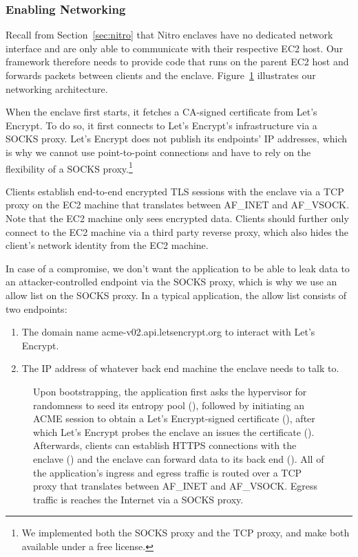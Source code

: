 
\subsubsection{Enabling Networking}
\label{sec:networking}

Recall from Section~\ref{sec:nitro} that Nitro enclaves have no dedicated network interface and are only able to communicate with their respective EC2 host.  Our framework therefore needs to provide code that runs on the parent EC2 host and forwards packets between clients and the enclave.  Figure~\ref{fig:networking} illustrates our networking architecture.

When the enclave first starts, it fetches a CA-signed certificate from Let's Encrypt.  To do so, it first connects to Let's Encrypt's infrastructure via a SOCKS proxy.  Let's Encrypt does not publish its endpoints' IP addresses, which is why we cannot use point-to-point connections and have to rely on the flexibility of a SOCKS proxy.\footnote{We implemented both the SOCKS proxy and the TCP proxy, and make both available under a free license.}

Clients establish end-to-end encrypted TLS sessions with the enclave via a TCP proxy on the EC2 machine that translates between AF\_INET and AF\_VSOCK.  Note that the EC2 machine only sees encrypted data. Clients should further only connect to the EC2 machine via a third party reverse proxy, which also hides the client's network identity from the EC2 machine.

In case of a compromise, we don't want the application to be able to leak data to an attacker-controlled endpoint via the SOCKS proxy, which is why we use an allow list on the SOCKS proxy.  In a typical application, the allow list consists of two endpoints:
\begin{enumerate}
    \item The domain name acme-v02.api.letsencrypt.org to interact with Let's Encrypt.
    \item The IP address of whatever back end machine the enclave needs to talk to.
\end{enumerate}


\newcommand{\addr}[1]{{\footnotesize \color{gray}#1 }}

\begin{figure}[t]
\centering

\caption{Upon bootstrapping, the application first asks the hypervisor for randomness to seed its entropy pool (), followed by initiating an ACME session to obtain a Let's Encrypt-signed certificate (), after which Let's Encrypt probes the enclave an issues the certificate ().  Afterwards, clients can establish HTTPS connections with the enclave () and the enclave can forward data to its back end ().  All of the application's ingress and egress  traffic is routed over a TCP proxy that translates between AF\_INET and AF\_VSOCK.  Egress traffic is reaches the Internet via a SOCKS proxy.}
\label{fig:networking}
\end{figure}

